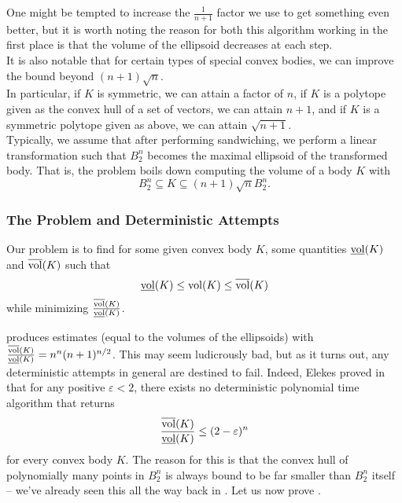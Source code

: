 
One might be tempted to increase the $\frac{1}{n+1}$ factor we use to get something even better, but it is worth noting the reason for both this algorithm working in the first place is that the volume of the ellipsoid decreases at each step.\\

It is also notable that for certain types of special convex bodies, we can improve the bound beyond $(n+1)\sqrt{n}$.\\
In particular, if $K$ is symmetric, we can attain a factor of $n$, if $K$ is a polytope given as the convex hull of a set of vectors, we can attain $n+1$, and if $K$ is a symmetric polytope given as above, we can attain $\sqrt{n+1}$.\\

Typically, we assume that after performing sandwiching, we perform a linear transformation such that $B_2^n$ becomes the maximal ellipsoid of the transformed body. That is, the problem boils down computing the volume of a body $K$ with
\[ B_2^n \subseteq K \subseteq (n+1)\sqrt{n} B_2^n. \]

\subsubsection{The Problem and Deterministic Attempts}

Our problem is to find for some given convex body $K$, some quantities $\underline{\operatorname{vol}}(K)$ and $\overline{\operatorname{vol}}(K)$ such that
\[ \underline{\operatorname{vol}}(K) \leq \operatorname{vol}(K) \leq \overline{\operatorname{vol}}(K) \]
while minimizing $\frac{\overline{\operatorname{vol}}(K)}{\underline{\operatorname{vol}}(K)}$.

 produces estimates (equal to the volumes of the ellipsoids) with $\frac{\overline{\operatorname{vol}}(K)}{\underline{\operatorname{vol}}(K)} = n^n (n+1)^{n/2}$. This may seem ludicrously bad, but as it turns out, any deterministic attempts in general are destined to fail. Indeed, Elekes proved in \cite{Elekes1986} that for any positive $\varepsilon<2$, there exists no deterministic polynomial time algorithm that returns
\begin{equation}
\label{eqn elekes deterministic SUCKS}
    \frac{\overline{\operatorname{vol}}(K)}{\underline{\operatorname{vol}}(K)} \leq (2-\varepsilon)^n
\end{equation}
for every convex body $K$. The reason for this is that the convex hull of polynomially many points in $B_2^n$ is always bound to be far smaller than $B_2^n$ itself -- we've already seen this all the way back in . Let us now prove .

